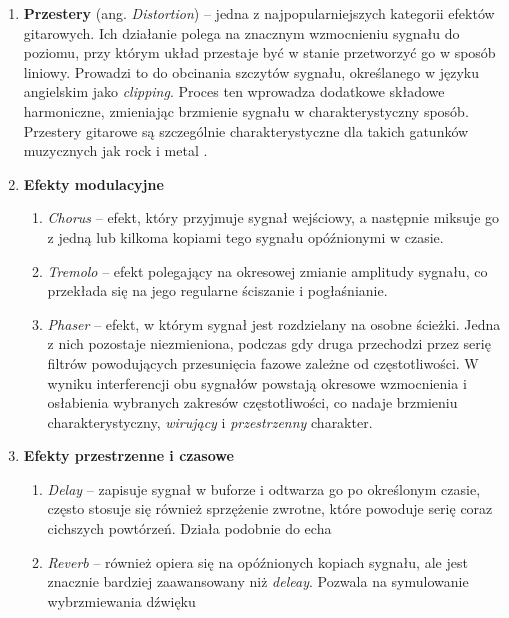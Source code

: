 \documentclass[12pt,a4paper]{report}
\begin{document}
\begin{enumerate}
  \item \textbf{Przestery} (ang. \textit{Distortion}) -- jedna z
    najpopularniejszych kategorii efektów gitarowych. Ich działanie
    polega na znacznym wzmocnieniu sygnału do poziomu, przy którym
    układ przestaje być w stanie przetworzyć go w sposób liniowy.
    Prowadzi to do obcinania szczytów sygnału, określanego w języku
    angielskim jako \textit{clipping}. Proces ten wprowadza dodatkowe
    składowe harmoniczne, zmieniając brzmienie sygnału w
    charakterystyczny sposób. Przestery gitarowe są szczególnie
    charakterystyczne dla takich gatunków muzycznych jak rock i metal
    \cite{distortion}.
  \item \textbf{Efekty modulacyjne}
    \begin{enumerate}
      \item \textit{Chorus} -- efekt, który przyjmuje sygnał
        wejściowy, a następnie miksuje go z jedną lub kilkoma kopiami
        tego sygnału opóźnionymi w czasie\cite{chorus}.
      \item \textit{Tremolo} -- efekt polegający na okresowej zmianie
        amplitudy sygnału\cite{realization_of_guitar_audio_effects},
        co przekłada się na jego regularne
        ściszanie i pogłaśnianie.
      \item \textit{Phaser} -- efekt, w którym sygnał jest
        rozdzielany na osobne ścieżki. Jedna z nich pozostaje
        niezmieniona, podczas gdy druga przechodzi przez serię
        filtrów powodujących przesunięcia fazowe zależne od
        częstotliwości. W wyniku interferencji obu sygnałów powstają
        okresowe wzmocnienia i osłabienia wybranych zakresów
        częstotliwości, co nadaje brzmieniu charakterystyczny,
        \textit{wirujący} i \textit{przestrzenny} charakter\cite{phaser}.
    \end{enumerate}
  \item \textbf{Efekty przestrzenne i czasowe}
    \begin{enumerate}
      \item \textit{Delay} -- zapisuje sygnał w buforze i odtwarza go
        po określonym czasie, często stosuje się również sprzężenie
        zwrotne, które powoduje serię coraz cichszych
        powtórzeń\cite{realization_of_guitar_audio_effects}.
        Działa podobnie do echa
      \item \textit{Reverb} -- również opiera się na opóźnionych
        kopiach sygnału, ale jest znacznie bardziej zaawansowany niż
        \textit{deleay}. Pozwala na symulowanie wybrzmiewania dźwięku

\end{enumerate}
\end{enumerate}
\end{document}
